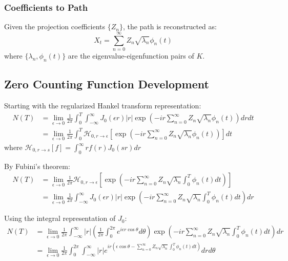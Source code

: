 \documentclass{article}
\begin{document}
\subsubsection*{Coefficients to Path}
Given the projection coefficients $\{Z_n\}$, the path is reconstructed as:
\begin{equation}
    X_t = \sum_{n=0}^{\infty} Z_n \sqrt{\lambda_n} \phi_n(t)
\end{equation}
where $\{\lambda_n, \phi_n(t)\}$ are the eigenvalue-eigenfunction pairs of $K$.

\subsection{Zero Counting Function Development}
Starting with the regularized Hankel transform representation:
\begin{equation}
\begin{split}
    N(T) &= \lim_{\epsilon \to 0} \frac{1}{2\pi} \int_0^T \int_{-\infty}^{\infty} J_0(\epsilon r)|r| \exp\left(-ir\sum_{n=0}^{\infty} Z_n \sqrt{\lambda_n} \phi_n(t)\right) dr dt \\
    &= \lim_{\epsilon \to 0} \frac{1}{2\pi} \int_0^T \mathcal{H}_{0,r\to\epsilon}\left[\exp\left(-ir\sum_{n=0}^{\infty} Z_n \sqrt{\lambda_n} \phi_n(t)\right)\right] dt
\end{split}
\end{equation}
where $\mathcal{H}_{0,r\to s}[f] = \int_0^\infty rf(r)J_0(sr)dr$

By Fubini's theorem:
\begin{equation}
\begin{split}
    N(T) &= \lim_{\epsilon \to 0} \frac{1}{2\pi} \mathcal{H}_{0,r\to\epsilon}\left[\exp\left(-ir\sum_{n=0}^{\infty} Z_n \sqrt{\lambda_n} \int_0^T \phi_n(t) dt\right)\right] \\
    &= \lim_{\epsilon \to 0} \frac{1}{2\pi} \int_{-\infty}^{\infty} J_0(\epsilon r)|r| \exp\left(-ir\sum_{n=0}^{\infty} Z_n \sqrt{\lambda_n} \int_0^T \phi_n(t) dt\right) dr
\end{split}
\end{equation}

Using the integral representation of $J_0$:
\begin{equation}
\begin{split}
    N(T) &= \lim_{\epsilon \to 0} \frac{1}{2\pi} \int_{-\infty}^{\infty} |r| \left(\frac{1}{2\pi} \int_0^{2\pi} e^{i\epsilon r\cos\theta} d\theta\right) \exp\left(-ir\sum_{n=0}^{\infty} Z_n \sqrt{\lambda_n} \int_0^T \phi_n(t) dt\right) dr \\
    &= \lim_{\epsilon \to 0} \frac{1}{2\pi} \int_0^{2\pi} \int_{-\infty}^{\infty} |r| e^{ir(\epsilon\cos\theta - \sum_{n=0}^{\infty} Z_n \sqrt{\lambda_n} \int_0^T \phi_n(t) dt)} dr d\theta
\end{split}
\end{equation}
\end{document}
